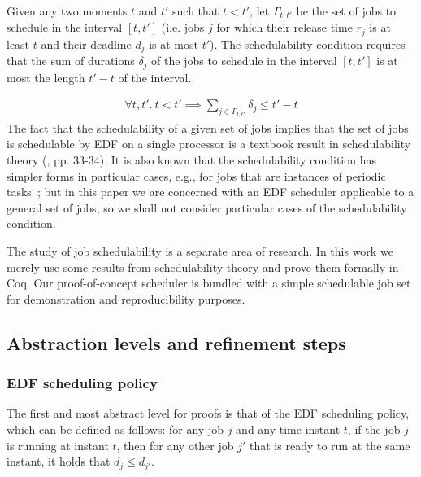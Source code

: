 	Given any two moments $t$ and $t'$ such that $t < t'$,
	let $\Gamma_{t, t'}$ be the set of jobs to schedule in the interval $[t, t']$
	(i.e. jobs $j$ for which their release time $r_j$ is at least $t$ and their deadline $d_j$ is at most $t'$).
	The schedulability condition requires that the sum of durations $\delta_j$ of the jobs to schedule in the interval $[t, t']$ is at most the length $t'-t$ of the interval.

	\begin{gather} \label{eq:schedulability}
    		\forall t, t'. ~t < t' \implies
    		\sum_{j \in \Gamma_{t, t'}}\delta_j \leq t' - t
	\end{gather}
	The fact that the schedulability of a given set of jobs implies that the set of jobs is schedulable by EDF on a single processor
	is a textbook result in schedulability theory (\cite{stankovic2012deadline}, pp. 33-34). It is also known that the schedulability condition has simpler forms in particular cases, e.g.,  for jobs that are instances of periodic tasks~\cite{stankovic2012deadline}; but in this paper we are concerned with an  EDF scheduler  applicable to a general set of jobs, so we shall not consider particular cases of the schedulability condition.

	The study of job schedulability is a separate area of research.
	In this work we merely use some results from schedulability theory and prove them formally in Coq.
	Our proof-of-concept scheduler is bundled with a simple schedulable job set for demonstration and reproducibility purposes.


	\subsection{Abstraction levels and refinement steps}

	\subsubsection{EDF scheduling policy}
	\label{sec:policy}
	The first and most abstract level for proofs is that of the EDF
	scheduling policy, which can be defined as follows: for any job $j$ and any time instant $t$, if the job $j$ is running at instant $t$,
	then for any other job $j'$ that is ready to run at the same instant, it holds that $d_j \leq d_{j'}$.

